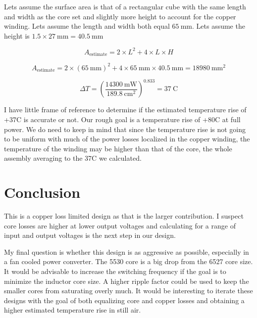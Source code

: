 \documentclass{article}
\begin{document}
Lets assume the surface area is that of a rectangular cube with the same length and width as the core set and slightly more height to account for the copper winding.  Lets assume the length and width both equal $\SI{65}{\milli\meter}$.  Lets assume the height is $\num{1.5} \times \SI{27}{\milli\meter} = \SI{40.5}{\milli\meter}$

\begin{equation}
A_\text{estimate} = 2 \times L^2 + 4 \times L \times H
\end{equation}

\begin{equation}
A_\text{estimate} = 2 \times (\SI{65}{\milli\meter})^2 + 4 \times \SI{65}{\milli\meter} \times \SI{40.5}{\milli\meter} = \SI{18980}{\milli\meter^2}
\end{equation}

\begin{equation}
\Delta T = (\frac{\SI{14300}{\milli\watt}}{\SI{189.8}{\centi\meter\squared}})^{0.833} = \SI{37}{\text{C}}
\end{equation}

I have little frame of reference to determine if the estimated temperature rise of +37C is accurate or not.  Our rough goal is a temperature rise of +80C at full power.  We do need to keep in mind that since the temperature rise is not going to be uniform with much of the power losses localized in the copper winding, the temperature of the winding may be higher than that of the core, the whole assembly averaging to the 37C we calculated.

\section{Conclusion}
This is a copper loss limited design as that is the larger contribution.  I suspect core losses are higher at lower output voltages and calculating for a range of input and output voltages is the next step in our design.

My final question is whether this design is as aggressive as possible, especially in a fan cooled power converter.  The 5530 core is a big drop from the 6527 core size.  It would be advisable to increase the switching frequency if the goal is to minimize the inductor core size.  A higher ripple factor could be used to keep the smaller cores from saturating overly much.  It would be interesting to iterate these designs with the goal of both equalizing core and copper losses and obtaining a higher estimated temperature rise in still air. 
\end{document}
